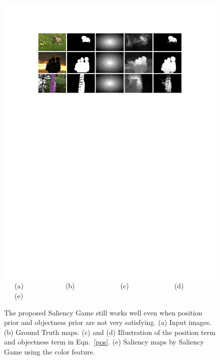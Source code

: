 \documentclass[journal]{IEEEtran}
\begin{document}
\begin{figure}[t]
\begin{center}
   \includegraphics[width=1\linewidth]{figure4.pdf}
         {~~~(a)~~~~~~~~~~~~(b)~~~~~~~~~~~~~(c)~~~~~~~~~~~~~(d)~~~~~~~~~~~~(e)~~~}
\end{center}
\vspace{-10pt}
   \caption{The proposed Saliency Game still works well even when position prior and objectness prior are not very satisfying. (a) Input images. (b) Ground Truth maps. (c) and (d) Illustration of the position term and objectness term in Eqn.~\ref{pos}. (e) Saliency maps by Saliency Game using the color feature.%
   }
\label{fig:4}
\end{figure}
\end{document}
